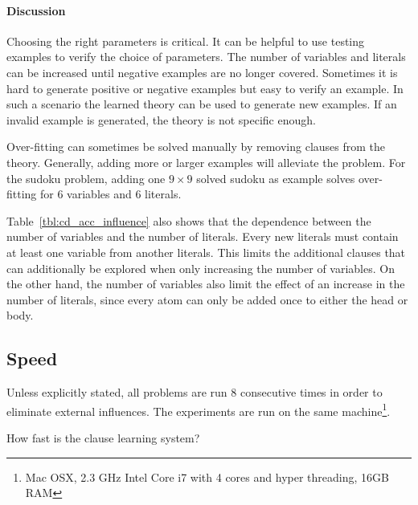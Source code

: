 \paragraph{Discussion}
	Choosing the right parameters is critical.
	It can be helpful to use testing examples to verify the choice of parameters.
	The number of variables and literals can be increased until negative examples are no longer covered.
	Sometimes it is hard to generate positive or negative examples but easy to verify an example.
	In such a scenario the learned theory can be used to generate new examples.
	If an invalid example is generated, the theory is not specific enough.

	Over-fitting can sometimes be solved manually by removing clauses from the theory.
	Generally, adding more or larger examples will alleviate the problem.
	For the sudoku problem, adding one $9 \times 9$ solved sudoku as example solves over-fitting for $6$ variables and $6$ literals.

	Table~\ref{tbl:cd_acc_influence} also shows that the dependence between the number of variables and the number of literals.
	Every new literals must contain at least one variable from another literals.
	This limits the additional clauses that can additionally be explored when only increasing the number of variables.
	On the other hand, the number of variables also limit the effect of an increase in the number of literals, since every atom can only be added once to either the head or body.
\subsection{Speed}

Unless explicitly stated, all problems are run $8$ consecutive times in order to eliminate external influences.
The experiments are run on the same machine\footnote{Mac OSX, 2.3 GHz Intel Core i7 with 4 cores and hyper threading, 16GB RAM}.

\begin{question}
	How fast is the clause learning system?
\end{question}

